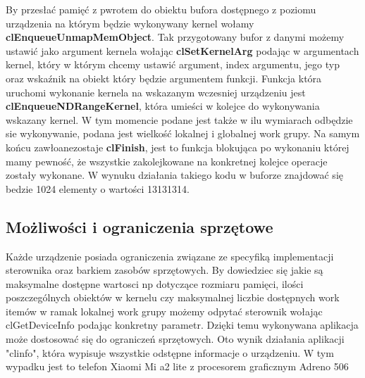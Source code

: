 By przesłać pamięć z pwrotem do obiektu bufora dostępnego z poziomu urządzenia na którym będzie wykonywany kernel wołamy \textbf{clEnqueueUnmapMemObject}.
Tak przygotowany bufor z danymi możemy ustawić jako argument kernela wołając \textbf{clSetKernelArg} podając w argumentach kernel, który w którym chcemy ustawić argument, index argumentu, jego typ oraz wskaźnik na obiekt który będzie argumentem funkcji.
Funkcja która uruchomi wykonanie kernela na wskazanym wczesniej urządzeniu jest \textbf{clEnqueueNDRangeKernel}, która umieści w kolejce do wykonywania wskazany kernel. W tym momencie podane jest także w ilu wymiarach odbędzie sie wykonywanie, podana jest wielkość lokalnej i globalnej work grupy.
Na samym końcu zawłoanezostaje \textbf{clFinish}, jest to funkcja blokująca po wykonaniu której mamy pewność, że wszystkie zakolejkowane na konkretnej kolejce operacje zostały wykonane.
W wynuku działania takiego kodu w buforze znajdować się bedzie 1024 elementy o wartości 13131314.
\subsection{Możliwości i ograniczenia sprzętowe}
Każde urządzenie posiada ograniczenia związane ze specyfiką implementacji sterownika oraz barkiem zasobów sprzętowych. By dowiedziec się jakie są maksymalne dostępne wartosci np dotyczące rozmiaru pamięci, ilości poszczególnych obiektów w kernelu czy maksymalnej liczbie dostępnych work itemów w ramak lokalnej work grupy możemy odpytać sterownik wołając clGetDeviceInfo podając konkretny parametr. Dzięki temu wykonywana aplikacja może dostosować się do ograniczeń sprzętowych. Oto wynik działania aplikacji "clinfo", która wypisuje wszystkie odstępne informacje o urządzeniu. W tym wypadku jest to telefon Xiaomi Mi a2 lite z procesorem graficznym Adreno 506
 

